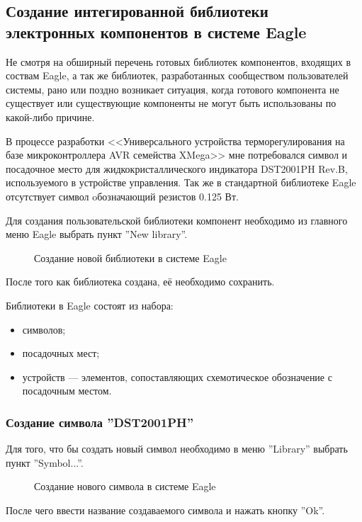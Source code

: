 \subsection{Создание интегированной библиотеки электронных компонентов в системе Eagle} 
Не смотря на обширный перечень готовых библиотек компонентов, входящих в соствам Eagle, а
так же библиотек, разработанных сообществом пользователей системы, рано или поздно возникает
ситуация, когда готового компонента не существует или существующие компоненты не могут
быть использованы по какой-либо причине.


В процессе разработки <<Универсального устройства терморегулирования на базе микроконтроллера
AVR семейства XMega>> мне потребовался символ и посадочное место для
жидкокристаллического индикатора DST2001PH Rev.B, используемого в устройстве управления.
Так же в стандартной библиотеке Eagle отсутствует символ oбозначающий резистов 0.125 Вт.

Для создания пользовательской библиотеки компонент необходимо из главного меню Eagle
выбрать пункт ''New library''.
\begin{figure}[ht]
	\caption{Создание новой библиотеки в системе Eagle}
	\label{img:newLibrary}
\end{figure}
После того как библиотека создана, её необходимо сохранить.


Библиотеки в Eagle состоят из набора:
\begin{itemize}
	\item{} символов;
	\item{} посадочных мест;
	\item{} устройств --- элементов, сопоставляющих схемотическое обозначение
		с посадочным местом.
\end{itemize}

\subsubsection{Создание символа ''DST2001PH''}

Для того, что бы создать новый символ необходимо в меню ''Library'' выбрать пункт ''Symbol...''.
\begin{figure}[ht]
	\caption{Создание нового символа в системе Eagle}
	\label{img:newSymbol}
\end{figure}
После чего ввести название создаваемого символа и нажать кнопку ''Ok''.

